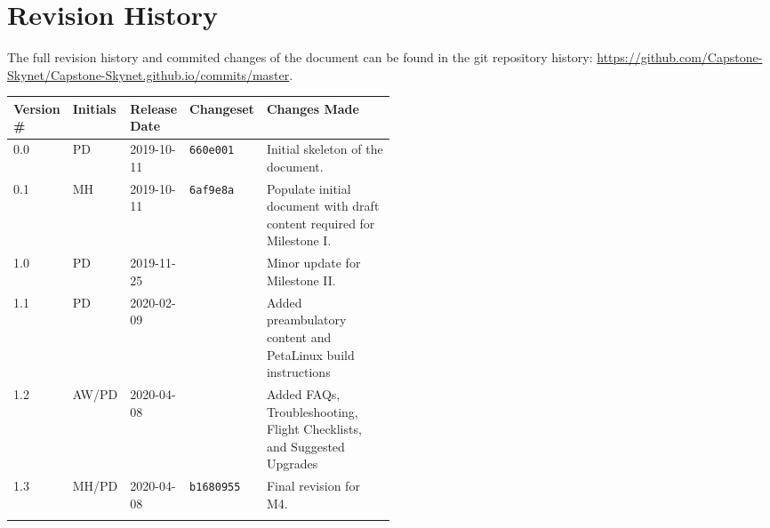 \section*{Revision History}
The full revision history and commited changes of the document can be found in the git repository history: \href{https://github.com/Capstone-Skynet/Capstone-Skynet.github.io}{https://github.com/Capstone-Skynet/Capstone-Skynet.github.io/commits/master}.

\begin{table}[H]
\begin{tabular}{*{4}{l}p{0.5\linewidth}}
\hline
Version \# & Initials & Release Date & Changeset & Changes Made \\ \hline

0.0 & PD & 2019-10-11 & \texttt{660e001} & Initial skeleton of the document.\\
0.1 & MH & 2019-10-11 & \texttt{6af9e8a} & Populate initial document with draft content required for Milestone I.\\
1.0 & PD & 2019-11-25 &  & Minor update for Milestone II.\\
1.1 & PD & 2020-02-09 &  & Added preambulatory content and PetaLinux build instructions \\
1.2 & AW/PD & 2020-04-08 &  & Added FAQs, Troubleshooting, Flight Checklists, and Suggested Upgrades \\
1.3 & MH/PD & 2020-04-08 & \texttt{b1680955} & Final revision for M4.\\

 & & & \\ \hline
\end{tabular}
\end{table}
